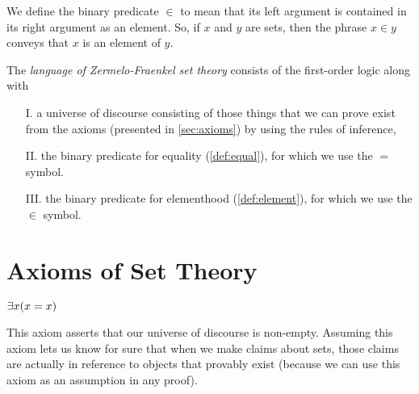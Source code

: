 \begin{definition}[Elementhood]\label{def:element}
    We define the binary predicate \(\in\) to mean that its left argument is
    contained in its right argument as an element.
    So, if \(x\) and \(y\) are sets, then the phrase \(x \in y\)
    conveys that \(x\) is an element of \(y\).
\end{definition}

\begin{definition}
    The \emph{language of Zermelo-Fraenkel set theory}
    consists of the first-order logic
    along with
    \begin{enumerate}
        \item[I.]
            a universe of discourse consisting of those things that we can prove exist
            from the axioms (presented in \autoref{sec:axioms}) by using the rules of inference,
        \item[II.]
            the binary predicate for equality (\autoref{def:equal}),
            for which we use the \(=\) symbol.
        \item[III.]
            the binary predicate for elementhood (\autoref{def:element}),
            for which we use the \(\in\) symbol.
    \end{enumerate}
\end{definition}

\newpage

\section{Axioms of Set Theory}\label{sec:axioms}

\setcounter{preaxiom}{-1}
\begin{axiom}[Existence]
    \(\exists x \pn*{x = x}\)
\end{axiom}
This axiom asserts that our universe of discourse is non-empty.
Assuming this axiom lets us know for sure that when we make claims about sets,
those claims are actually in reference to objects that provably exist
(because we can use this axiom as an assumption in any proof).


